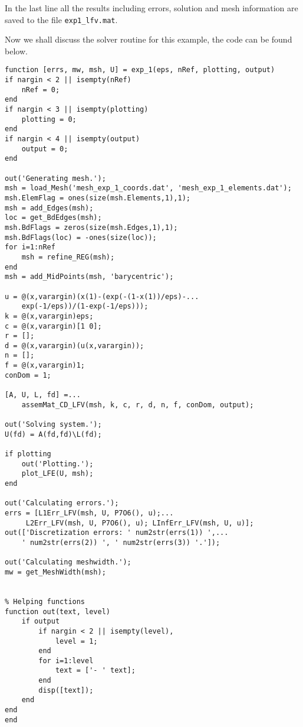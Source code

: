In the last line all the results including errors, solution and mesh information are saved to the file \texttt{exp1\_lfv.mat}.

Now we shall discuss the solver routine for this example, the code can be found below.

\begin{lstlisting}
function [errs, mw, msh, U] = exp_1(eps, nRef, plotting, output)
if nargin < 2 || isempty(nRef)
    nRef = 0;
end
if nargin < 3 || isempty(plotting)
    plotting = 0;
end
if nargin < 4 || isempty(output)
    output = 0;
end
    
out('Generating mesh.');
msh = load_Mesh('mesh_exp_1_coords.dat', 'mesh_exp_1_elements.dat');
msh.ElemFlag = ones(size(msh.Elements,1),1);
msh = add_Edges(msh);
loc = get_BdEdges(msh);
msh.BdFlags = zeros(size(msh.Edges,1),1);
msh.BdFlags(loc) = -ones(size(loc));
for i=1:nRef
    msh = refine_REG(msh);
end
msh = add_MidPoints(msh, 'barycentric');

u = @(x,varargin)(x(1)-(exp(-(1-x(1))/eps)-...
	exp(-1/eps))/(1-exp(-1/eps)));
k = @(x,varargin)eps;
c = @(x,varargin)[1 0];
r = [];
d = @(x,varargin)(u(x,varargin));
n = [];
f = @(x,varargin)1;
conDom = 1;

[A, U, L, fd] =...
    assemMat_CD_LFV(msh, k, c, r, d, n, f, conDom, output);
  
out('Solving system.');
U(fd) = A(fd,fd)\L(fd);

if plotting 
    out('Plotting.');
    plot_LFE(U, msh);
end

out('Calculating errors.');
errs = [L1Err_LFV(msh, U, P7O6(), u);...
     L2Err_LFV(msh, U, P7O6(), u); LInfErr_LFV(msh, U, u)];
out(['Discretization errors: ' num2str(errs(1)) ',...
    ' num2str(errs(2)) ', ' num2str(errs(3)) '.']);

out('Calculating meshwidth.');
mw = get_MeshWidth(msh);


% Helping functions
function out(text, level)
    if output
        if nargin < 2 || isempty(level),
            level = 1;
        end
        for i=1:level
            text = ['- ' text];
        end
        disp([text]);
    end
end
end

\end{lstlisting}

